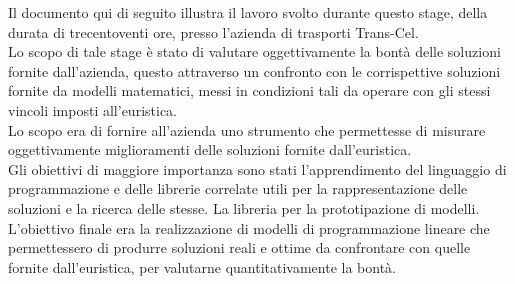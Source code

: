 
Il documento qui di seguito illustra il lavoro svolto durante questo stage, della durata di trecentoventi ore, presso l’azienda di trasporti Trans-Cel.\\
Lo scopo di tale stage è stato di valutare oggettivamente la bontà delle soluzioni fornite dall'azienda, questo attraverso un confronto con le corrispettive soluzioni fornite da modelli matematici, messi in condizioni tali da operare con gli stessi vincoli imposti all'euristica.\\
Lo scopo era di fornire all'azienda uno strumento che permettesse di misurare oggettivamente miglioramenti delle soluzioni fornite dall'euristica.\\
\newline
Gli obiettivi di maggiore importanza sono stati l'apprendimento del linguaggio di programmazione  e delle librerie correlate utili per la rappresentazione delle soluzioni e la ricerca delle stesse. La libreria  per la prototipazione di modelli.\\
L'obiettivo finale era la realizzazione di modelli di programmazione lineare che permettessero di produrre soluzioni reali e ottime da confrontare con quelle fornite dall'euristica, per valutarne quantitativamente la bontà.